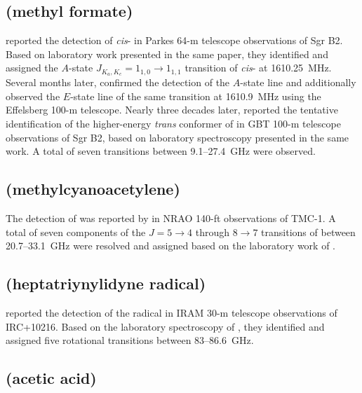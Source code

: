\documentclass[twocolumn]{aastex631}
\begin{document}
    \subsection{ (methyl formate)}
	\label{HCOOCH3}
	
	\citet{Brown:1975jh} reported the detection of \emph{cis}- in Parkes 64-m telescope observations of Sgr B2.  Based on laboratory work presented in the same paper, they identified and assigned the $A$-state $J_{K_a,K_c} = 1_{1,0}\rightarrow1_{1,1}$ transition of \emph{cis}- at 1610.25~MHz.  Several months later, \citet{Churchwell:1975ps} confirmed the detection of the $A$-state line and additionally observed the $E$-state line of the same transition at 1610.9~MHz using the Effelsberg 100-m telescope.  Nearly three decades later, \citet{Neill:2012fr} reported the tentative identification of the higher-energy \emph{trans} conformer of  in GBT 100-m telescope observations of Sgr B2, based on laboratory spectroscopy presented in the same work.  A total of seven transitions between 9.1--27.4~GHz were observed.
	
	\subsection{ (methylcyanoacetylene)}
	\label{CH3C3N}
	
	The detection of  was reported by \citet{Broten:1984xp} in NRAO 140-ft observations of TMC-1.  A total of seven components of the $J = 5\rightarrow4$ through $8\rightarrow7$ transitions of  between 20.7--33.1~GHz were resolved and assigned based on the laboratory work of \citet{Moises:1982wx}. 
	
	\subsection{ (heptatriynylidyne radical)}
	\label{C7H}
	
	\citet{Guelin:1997uy} reported the detection of the  radical in IRAM 30-m telescope observations of IRC+10216.  Based on the laboratory spectroscopy of \citet{Travers:1996gx}, they identified and assigned five rotational transitions between 83--86.6~GHz.
	
	\subsection{ (acetic acid)}
	\label{CH3COOH}
	
\end{document}
